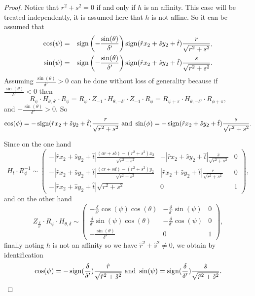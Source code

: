 \begin{proof}
 \noindent Notice that $r^{2}+s^{2}=0$ if and only if $h$ is an affinity. This case will be treated independently, it is assumed here that $h$ is not affine. So it can be assumed that
 \begin{eqnarray*}
 \cos(\psi) &=& \operatorname{sign}\left(-\frac{\sin(\theta)}{ \delta'}\right)\operatorname{sign}(\hat r x_2 + \hat s y_2 +\hat t)\frac{r}{\sqrt{r^{2}+s^{2}}},\\
 \sin(\psi) &=& \operatorname{sign}\left(-\frac{\sin(\theta)}{ \delta'}\right)\operatorname{sign}(\hat r x_2 + \hat s y_2 +\hat t)\frac{s}{\sqrt{r^{2}+s^{2}}}.
 \end{eqnarray*}
 Assuming $\frac{\sin(\theta)}{\delta'}>0$ can be done without loss of generality because if $\frac{\sin(\theta)}{\delta'}<0$ then  \begin{equation*}
 R_{\psi} \cdot H_{\theta,\delta'} \cdot R_{\phi}=R_{\psi} \cdot Z_{-1}\cdot H_{\theta,-\delta'}\cdot Z_{-1} \cdot R_{\phi}= R_{\psi+\pi} \cdot H_{\theta,-\delta'}\cdot R_{\phi+\pi},
 \end{equation*}
 and  $-\frac{\sin(\theta)}{\delta'}>0$. So
 \begin{equation*}
 \cos( \phi )= -\operatorname{sign}(\hat r x_2 +\hat s y_2 +\hat t) \frac{r}{\sqrt{r^2 + s^2}} \text{ and } \sin( \phi )= -\operatorname{sign}(\hat r x_2 +\hat s y_2 +\hat t) \frac{s}{\sqrt{r^2 + s^2}}.
 \end{equation*}
 
 
 Since on the one hand
 \begin{equation*}
 H_t \cdot R_{\phi}^{-1} \sim
 \begin{pmatrix}
 -|\hat r x_2 +\hat s y_2 +\hat t|\frac{(ar+sb)-(r^2 + s^2)x_2}{\sqrt{r^2 + s^2}}&-|\hat r x_2 +\hat s y_2 +\hat t|\frac{\hat s}{\sqrt{r^2 + s^2}}&0\\
 -|\hat r x_2 +\hat s y_2 +\hat t|\frac{(cr+sd)-(r^2 + s^2)y_2}{\sqrt{r^2 + s^2}}&|\hat r x_2 +\hat s y_2 +\hat t|\frac{r}{\sqrt{r^2 + s^2}}&0\\
 -|\hat r x_2 +\hat s y_2 +\hat t|\sqrt{r^2 + s^2}&0&1
 \end{pmatrix},
 \end{equation*}
and on the other hand
 \begin{equation*}
Z_{\frac{\delta}{\delta'}} \cdot R_{\psi} \cdot H_{\theta,\delta}  \sim 
 \begin{pmatrix}
 -\frac{\delta}{\delta'}\cos(\psi)\cos(\theta)&
-\frac{\delta}{\delta'}\sin(\psi)&
0\\
\frac{\delta}{\delta'}\sin(\psi)\cos(\theta)&
-\frac{\delta}{\delta'}\cos(\psi)&
0\\
-\frac{\sin(\theta)}{\delta'}&
0&
1
 \end{pmatrix},
 \end{equation*}
finally noting $h$ is not an affinity so we have $\hat r^2 + \hat s^2 \ne 0$, we obtain by identification 
 \begin{equation*}
  \cos( \psi ) =- \operatorname{sign}(\frac{\delta}{\delta'})\frac{\hat r}{\sqrt{\hat r^2 + \hat s^2}}\text{ and } \sin( \psi ) = \operatorname{sign}(\frac{\delta}{\delta'})\frac{\hat s}{\sqrt{\hat r^2 + \hat s^2}}.
 \end{equation*}
 

\end{proof}
